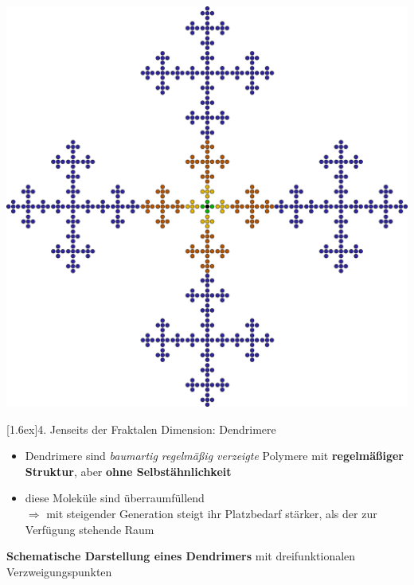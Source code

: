 \documentclass[final]{beamer}
\newlength{\columnheight}
\newlength{\marginw}
\newlength{\tw}
\newlength{\colw}
\newenvironment{myTwoColPoster}{%
  \begin{minipage}[t]{\textwidth}%
    \hspace*{\marginw}%
    \hspace*{9.5bp}%
    \begin{minipage}[t]{\tw}}%
  {\end{minipage}%
   \hspace*{\marginw}%
   \end{minipage}}
\newenvironment{myCol}%
    {\begin{minipage}[t][\columnheight][t]{\colw}}%
    {\end{minipage}}
\newenvironment{textblock}[1]%
    {\begin{block}{\rule[-0.6ex]{0pt}{2.4ex}\raisebox{-0.25ex}[1.6ex]{#1}}%
     \vspace*{5mm}}%
    {\vspace*{5mm}\end{block}}
\begin{document}
\begin{frame}[t]{}
\begin{myTwoColPoster}
\begin{myCol}
\begin{minipage}[c]{0.48\textwidth}
{{        \includegraphics[width=1.1\textwidth]{fig/Vicsek_f4}}
    }
  \end{minipage}
  \vspace*{-1cm}
  \begin{textblock}{4. Jenseits der Fraktalen Dimension: Dendrimere}
    \begin{itemize}\setlength\itemsep{1.4em}\large
      \item Dendrimere sind \textit{baumartig regelmäßig verzeigte} Polymere mit \textbf{regelmäßiger Struktur}, aber \textbf{ohne Selbstähnlichkeit}
      \item diese Moleküle sind \textcolor{IPForange}{überraumfüllend}\\
      $\Rightarrow$ mit steigender Generation steigt ihr Platzbedarf stärker, als der zur Verfügung stehende Raum
    \end{itemize}
    \begin{center}
      \textbf{Schematische Darstellung eines Dendrimers} mit dreifunktionalen Verzweigungspunkten\\[2cm]

\end{center}
\end{textblock}
\end{myCol}
\end{myTwoColPoster}
\end{frame}
\end{document}
